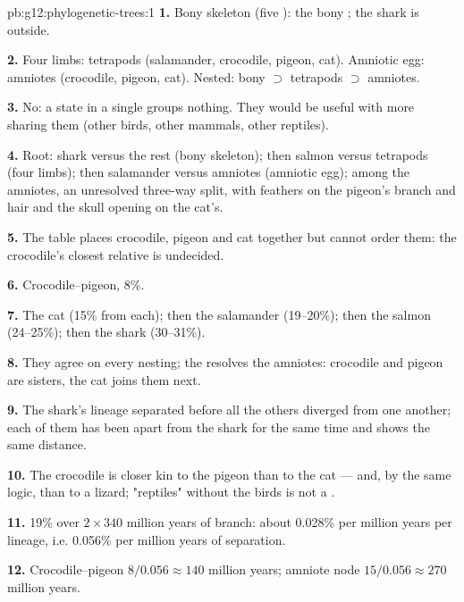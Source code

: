 \begin{solution}{pb:g12:phylogenetic-trees:1}
\textbf{1.} Bony skeleton (five ): the bony ; the
shark is outside.

\textbf{2.} Four limbs: tetrapods (salamander, crocodile, pigeon,
cat). Amniotic egg: amniotes (crocodile, pigeon, cat). Nested:
bony  $\supset$ tetrapods $\supset$ amniotes.

\textbf{3.} No: a state in a single  groups nothing. They
would be useful with more  sharing them (other birds, other
mammals, other reptiles).

\textbf{4.} Root: shark versus the rest (bony skeleton); then salmon
versus tetrapods (four limbs); then salamander versus amniotes
(amniotic egg); among the amniotes, an unresolved three-way split, with
feathers on the pigeon's branch and hair and the skull opening on the
cat's.

\textbf{5.} The table places crocodile, pigeon and cat together but
cannot order them: the crocodile's closest relative is undecided.

\textbf{6.} Crocodile--pigeon, 8\%.

\textbf{7.} The cat (15\% from each); then the salamander (19--20\%);
then the salmon (24--25\%); then the shark (30--31\%).

\textbf{8.} They agree on every nesting; the  resolves the
amniotes: crocodile and pigeon are sisters, the cat joins them next.

\textbf{9.} The shark's lineage separated before all the others
diverged from one another; each of them has been apart from the shark
for the same time and shows the same distance.

\textbf{10.} The crocodile is closer kin to the pigeon than to the
cat --- and, by the same logic, than to a lizard; "reptiles" without
the birds is not a .

\textbf{11.} 19\% over $2 \times 340$ million years of branch: about
0.028\% per million years per lineage, i.e. 0.056\% per million years
of separation.

\textbf{12.} Crocodile--pigeon $8/0.056 \approx 140$ million years;
amniote node $15/0.056 \approx 270$ million years.


\end{solution}
